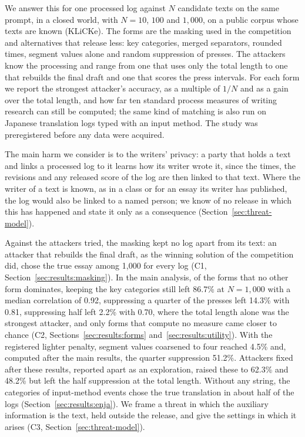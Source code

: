 We answer this for one processed log against $N$ candidate texts on the same prompt, in a closed world, with $N =
10$, $100$ and $1{,}000$, on a public corpus whose texts are known (KLiCKe). The forms are the masking used in the
competition and alternatives that release less: key categories, merged separators, rounded times, segment values
alone and random suppression of presses. The attackers know the processing and range from one that uses only the
total length to one that rebuilds the final draft and one that scores the press intervals. For each form we report
the strongest attacker's accuracy, as a multiple of $1/N$ and as a gain over the total length, and how far ten
standard process measures of writing research can still be computed; the same kind of matching is also run on
Japanese translation logs typed with an input method. The study was preregistered before any data were acquired.

The main harm we consider is to the writers' privacy: a party that holds a text and links a processed log to it learns
how its writer wrote it, since the times, the revisions and any released score of the log are then linked to that
text. Where the writer of a text is known, as
in a class or for an essay its writer has published, the log would also be linked to a named person; we know of no
release in which this has happened and state it only as a consequence (Section~\ref{sec:threat-model}).

Against the attackers tried, the masking kept no log apart from its text: an attacker that rebuilds the final draft,
as the winning solution of the competition did, chose the true essay among 1,000 for every log (C1,
Section~\ref{sec:results:masking}). In the main analysis, of the forms that no other form dominates, keeping the key
categories still left 86.7\% at $N = 1{,}000$ with a median correlation of 0.92, suppressing a quarter of the presses
left 14.3\% with 0.81, suppressing half left 2.2\% with 0.70, where the total length alone was the strongest attacker,
and only forms that compute no measure came closer to chance (C2, Sections~\ref{sec:results:forms}
and~\ref{sec:results:utility}). With the registered lighter penalty, segment values coarsened to four reached 4.5\% and,
computed after the main results, the quarter suppression 51.2\%. Attackers fixed after these results, reported apart as an exploration, raised
these to 62.3\% and 48.2\% but left the half suppression at the total length. Without any string, the
categories of input-method events chose the true translation in about half of the logs (Section~\ref{sec:results:enja}). We frame a threat in which the auxiliary information
is the text, held outside the release, and give the settings in which it arises (C3, Section~\ref{sec:threat-model}).
